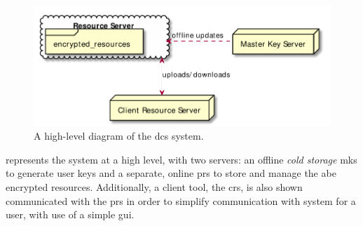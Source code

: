 \begin{figure}[htp]
  \centering
  \includegraphics[width=0.7\linewidth,keepaspectratio]{images/infrastructure/deployment_abbrv.pdf}

  \caption{A high-level diagram of the \acrshort{dcs} \theResServer system.}

  \label{fig:deployment_abbrv_diagram}
\end{figure}

 represents the \theResServer system at a high level, with two servers: an offline \emph{cold storage} \acrfull{mks} to generate user keys and a separate, online \acrfull{prs} to store and manage the \acrshort{abe} encrypted resources. Additionally, a client tool, the \acrfull{crs}, is also shown communicated with the \acrshort{prs} in order to simplify communication with system for a user, with use of a simple \acrshort{gui}.
